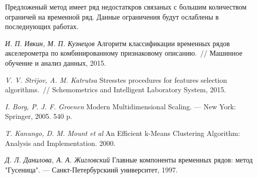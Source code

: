 \documentclass[12pt, twoside]{article}
\begin{document}
Предложеный метод имеет ряд недостаткров связаных с большим количеством ограничей на временной ряд. Данные ограничения будут ослаблены в последнующих работах.

\begin{thebibliography}{99}
	\textit{И. П. Ивкин,  М. П. Кузнецов} Алгоритм классификации временных рядов акселерометра по комбинированному признаковому описанию.~// Машинное обучение и анализ данных, 2015.
	
	\textit{V. V. Strijov, A. M. Katrutsa} Stresstes procedures for features selection algorithms.~// Schemometrics and Intelligent Laboratory System, 2015.
	
	\textit{I. Borg, P. J. F. Groenen} Modern Multidimensional Scaling. --- New York: Springer, 2005. 540 p.
	
	\textit{T. Kanungo, D. M. Mount et al} An Efficient k-Means Clustering Algorithm: Analysis and Implementation. 2000.
	
	\textit{Д. Л. Данилова, А. А. Жигловский} Главные компоненты временных рядов: метод "Гусеница". --- Санкт-Петербурскиий университет, 1997.
	
\end{thebibliography}
\end{document}
